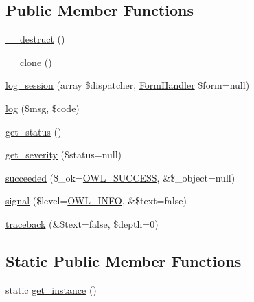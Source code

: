 \subsection*{Public Member Functions}
\begin{DoxyCompactItemize}
\item 
\hyperlink{classLogHandler_aacd0c653489cf221423b9edd62e81458}{\_\-\_\-destruct} ()
\item 
\hyperlink{classLogHandler_a395099dd9f1e9794bfe6a0c771991c3c}{\_\-\_\-clone} ()
\item 
\hyperlink{classLogHandler_a96f9831cfceceffa055ba46b2deb6734}{log\_\-session} (array \$dispatcher, \hyperlink{classFormHandler}{FormHandler} \$form=null)
\item 
\hyperlink{classLogHandler_a6d0139ed72f63093ca00f949ed5a73cb}{log} (\$msg, \$code)
\item 
\hyperlink{class__OWL_a99ec771fa2c5c279f80152cc09e489a8}{get\_\-status} ()
\item 
\hyperlink{class__OWL_adf9509ef96858be7bdd9414c5ef129aa}{get\_\-severity} (\$status=null)
\item 
\hyperlink{class__OWL_a53ab4d3bbb2c6a56966c339ca4b4c805}{succeeded} (\$\_\-ok=\hyperlink{owl_8severitycodes_8php_a96223f06ba27bf5cbefa6e9d702897c2}{OWL\_\-SUCCESS}, \&\$\_\-object=null)
\item 
\hyperlink{class__OWL_a51ba4a16409acf2a2f61f286939091a5}{signal} (\$level=\hyperlink{owl_8severitycodes_8php_a139328861128689f2f4def6a399d9057}{OWL\_\-INFO}, \&\$text=false)
\item 
\hyperlink{class__OWL_aa29547995d6741b7d2b90c1d4ea99a13}{traceback} (\&\$text=false, \$depth=0)
\end{DoxyCompactItemize}
\subsection*{Static Public Member Functions}
\begin{DoxyCompactItemize}
\item 
static \hyperlink{classLogHandler_aff978ec836c28d7b6e08a84802aa1c6d}{get\_\-instance} ()
\end{DoxyCompactItemize}
